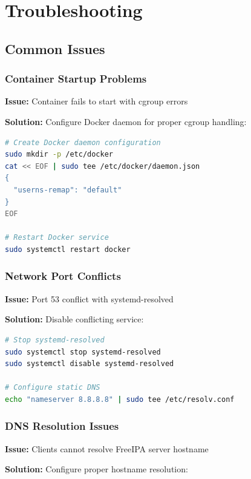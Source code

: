 \documentclass[12pt,a4paper]{report}
\begin{document}
\chapter{Troubleshooting}

\section{Common Issues}

\subsection{Container Startup Problems}

\textbf{Issue:} Container fails to start with cgroup errors

\textbf{Solution:} Configure Docker daemon for proper cgroup handling:

\begin{lstlisting}[language=bash,caption=Docker Cgroup Configuration]
# Create Docker daemon configuration
sudo mkdir -p /etc/docker
cat << EOF | sudo tee /etc/docker/daemon.json
{
  "userns-remap": "default"
}
EOF

# Restart Docker service
sudo systemctl restart docker
\end{lstlisting}

\subsection{Network Port Conflicts}

\textbf{Issue:} Port 53 conflict with systemd-resolved

\textbf{Solution:} Disable conflicting service:

\begin{lstlisting}[language=bash,caption=Resolve Port Conflicts]
# Stop systemd-resolved
sudo systemctl stop systemd-resolved
sudo systemctl disable systemd-resolved

# Configure static DNS
echo "nameserver 8.8.8.8" | sudo tee /etc/resolv.conf
\end{lstlisting}

\subsection{DNS Resolution Issues}

\textbf{Issue:} Clients cannot resolve FreeIPA server hostname

\textbf{Solution:} Configure proper hostname resolution:
\end{document}
